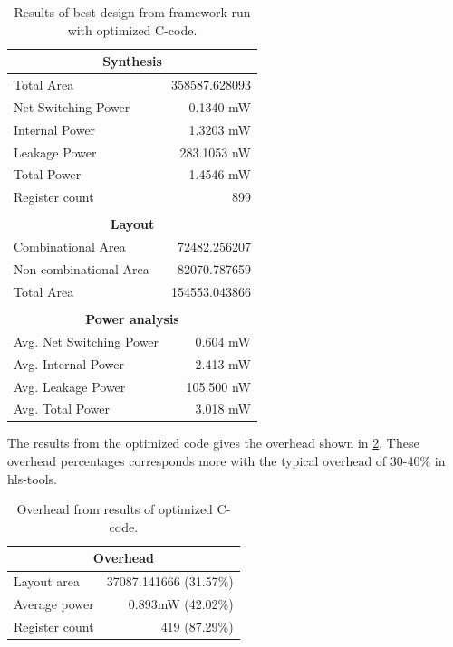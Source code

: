 \begin{table}[hbtp]
    \centering
    \begin{tabular}{lr}
    \multicolumn{2}{c}{\textbf{Synthesis}} \\
    \toprule
    Total Area & 358587.628093 \\
    \hline
    Net Switching Power & 0.1340 mW \\
    Internal Power & 1.3203 mW \\
    Leakage Power & 283.1053 nW \\
    \hline
    Total Power & 1.4546 mW \\
    \hline
    Register count & 899 \\ 
    \bottomrule
    & \\
    \multicolumn{2}{c}{\textbf{Layout}} \\
    \toprule
    Combinational Area & 72482.256207 \\
    Non-combinational Area & 82070.787659 \\
    \hline
    Total Area & 154553.043866 \\
    \bottomrule
    & \\
    \multicolumn{2}{c}{\textbf{Power analysis}} \\
    \toprule
    Avg. Net Switching Power & 0.604 mW \\
    Avg. Internal Power & 2.413 mW \\
    Avg. Leakage Power & 105.500 nW \\
    \hline
    Avg. Total Power & 3.018 mW \\
    \bottomrule
    \end{tabular}
    \caption{Results of best design from framework run with optimized C-code.}
    \label{tab:resultsframeworkrun3}
\end{table}
The results from the optimized code gives the overhead shown in \cref{tab:overheadframeworkrun3}. These overhead percentages corresponds more with the typical overhead of 30-40\% in \gls{hls}-tools.
\begin{table}[hbtp]
    \centering
    \begin{tabular}{lr}
    \multicolumn{2}{c}{\textbf{Overhead}} \\
    \toprule
    Layout area & 37087.141666 (31.57\%) \\
    Average power & 0.893mW (42.02\%) \\
    Register count & 419 (87.29\%) \\
    \bottomrule
    \end{tabular}
    \caption{Overhead from results of optimized C-code.}
    \label{tab:overheadframeworkrun3}
\end{table}

